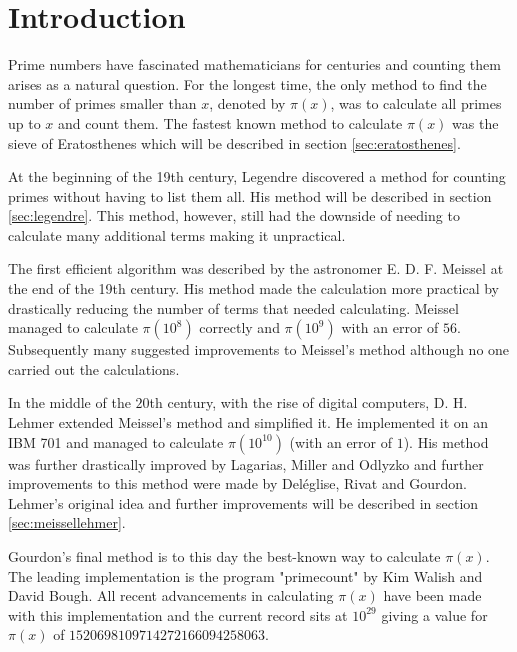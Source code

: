 %

\usepackage{./tikzit/tikzit}

\usepackage[
	sortcites=true,
	maxnames=6,
	minnames=6
]{biblatex}

\usepackage[stable]{footmisc}
\usepackage{caption}
\usepackage{subcaption}
\usepackage{algorithm}
\usepackage{algpseudocode}
\usepackage{listings}
\lstset{
	breakatwhitespace=True,
	breaklines=True,
	tabsize=2,
	extendedchars=True,
	keepspaces=True
}

	


\section{Introduction}
Prime numbers have fascinated mathematicians for centuries and counting them arises as a natural question.
For the longest time, the only method to find the number of primes smaller than $x$, denoted by $\pi(x)$,
was to calculate all primes up to $x$ and count them.
The fastest known method to calculate $\pi(x)$ was the sieve of Eratosthenes
which will be described in section \ref{sec:eratosthenes}.

At the beginning of the 19th century, Legendre discovered a method for counting primes without having to list them all.
His method will be described in section \ref{sec:legendre}. This method, however, still had the downside of needing to calculate many additional terms
making it unpractical.

The first efficient algorithm was described by the astronomer E. D. F. Meissel at the end of the 19th century.
His method made the calculation more practical by drastically reducing the number of terms that needed calculating.
Meissel managed to calculate $\pi(10^{8})$ correctly and $\pi(10^{9})$ with an error of $56$.
Subsequently many suggested improvements to Meissel's method although no one carried out the calculations.

In the middle of the $20$th century, with the rise of digital computers, D. H. Lehmer extended Meissel's
method and simplified it. He implemented it on an IBM 701 and managed to calculate  $\pi(10^{10})$ (with an error of $1$).
His method was further drastically improved by Lagarias, Miller and Odlyzko and further improvements to this method were made 
by Deléglise, Rivat and Gourdon. Lehmer's original idea and further improvements will be described in section \ref{sec:meissellehmer}.

Gourdon's final method is to this day the best-known way to calculate $\pi(x)$.
The leading implementation is the program "primecount" by Kim Walish and David Bough.
All recent advancements in calculating $\pi(x)$ have been made with this implementation
and the current record sits at $10^{29}$ giving a value for $\pi(x)$ of $1 520 698 109 714 272 166 094 258 063$. 

